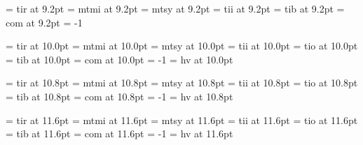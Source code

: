  \font\ninrm  = tir	at 9.2pt		%
\font\ninmi  = mtmi	at 9.2pt		%
    \skewchar{} 		%
\font\ninsy  = mtsy	at 9.2pt		%
    \skewchar{}		%
 \font\ninit  = tii	at 9.2pt		%
 \font\ninbf  = tib	at 9.2pt		%
 \font\nintt  = com	at 9.2pt		%
    \hyphenchar\nintt = -1		%

 \font\tenrm  = tir	at 10.0pt		%
\font\tenmi  = mtmi	at 10.0pt		%
    \skewchar{}		%
\font\tensy  = mtsy	at 10.0pt		%
    \skewchar{}		%
 \font\tenit  = tii	at 10.0pt		%
 \font\tensl  = tio	at 10.0pt		%
 \font\tenbf  = tib	at 10.0pt		%
 \font\tentt  = com	at 10.0pt		%
    \hyphenchar\tentt = -1		%
 \font\tensf  = hv	at 10.0pt		%

 \font\elvrm  = tir	at 10.8pt		%
\font\elvmi  = mtmi	at 10.8pt		%
    \skewchar{} 		%
\font\elvsy  = mtsy	at 10.8pt		%
    \skewchar{}		%
 \font\elvit  = tii	at 10.8pt		%
 \font\elvsl  = tio	at 10.8pt		%
 \font\elvbf  = tib	at 10.8pt		%
 \font\elvtt  = com	at 10.8pt		%
    \hyphenchar\elvtt = -1		%
 \font\elvsf  = hv	at 10.8pt		%

 \font\twlrm  = tir	at 11.6pt		%
\font\twlmi  = mtmi	at 11.6pt		%
    \skewchar{} 		%
\font\twlsy  = mtsy	at 11.6pt		%
    \skewchar{}		%
 \font\twlit  = tii	at 11.6pt		%
 \font\twlsl  = tio	at 11.6pt		%
 \font\twlbf  = tib	at 11.6pt		%
 \font\twltt  = com	at 11.6pt		%
    \hyphenchar\twltt = -1		%
 \font\twlsf  = hv	at 11.6pt		%

